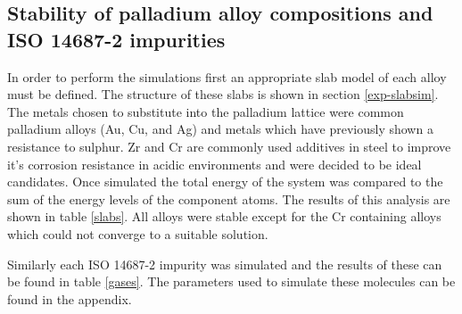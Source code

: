 \subsection{Stability of palladium alloy compositions and ISO 14687-2 impurities}
In order to perform the simulations first an appropriate slab model of each alloy must be defined. The structure of these slabs is shown in section \ref{exp-slabsim}. The metals chosen to substitute into the palladium lattice were common palladium alloys (Au, Cu, and Ag) and metals which have previously shown a resistance to sulphur. Zr\cite{SHIN2018102} and Cr\cite{MARCUS1990377} are commonly used additives in steel to improve it's corrosion resistance in acidic environments and were decided to be ideal candidates. Once simulated the total energy of the system was compared to the sum of the energy levels of the component atoms. The results of this analysis are shown in table \ref{slabs}. All alloys were stable except for the Cr containing alloys which could not converge to a suitable solution. 

Similarly each ISO 14687-2 impurity was simulated and the results of these can be found in table \ref{gases}. The parameters used to simulate these molecules can be found in the appendix.

